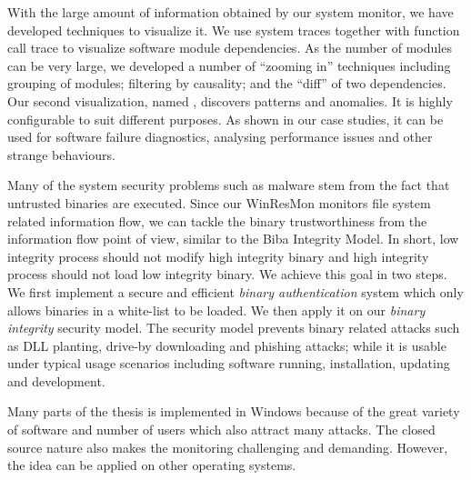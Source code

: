 With the large amount of information obtained by our system monitor,
we have developed techniques to visualize it.
We use system traces together with function call trace to visualize
software module dependencies.
As the number of modules can be very large,
we developed a number of ``zooming in'' techniques including
grouping of modules; filtering by causality;
and the ``diff'' of two dependencies.
Our second visualization, named , discovers patterns and anomalies.
It is highly configurable to suit different purposes.
As shown in our case studies,
it can be used for software failure diagnostics,
analysing performance issues and other strange behaviours.

Many of the system security problems such as malware stem from the fact that
untrusted binaries are executed.
Since our WinResMon monitors file system related information flow,
we can tackle the binary trustworthiness from the information
flow point of view, similar to the Biba Integrity Model.
In short, low integrity process should not modify high integrity binary and
high integrity process should not load low integrity binary.
We achieve this goal in two steps.
We first implement a secure and efficient {\em binary authentication} system
which only allows binaries in a white-list to be loaded.
We then apply it on our {\em binary integrity} security model.
The security model prevents binary related attacks such as DLL planting,
drive-by downloading and phishing attacks;
while it is usable under typical usage scenarios including
software running, installation, updating and development.

Many parts of the thesis is implemented in Windows because of the great
variety of software and number of users which also attract many attacks.
The closed source nature also makes the monitoring challenging and
demanding.
However, the idea can be applied on other operating systems.
